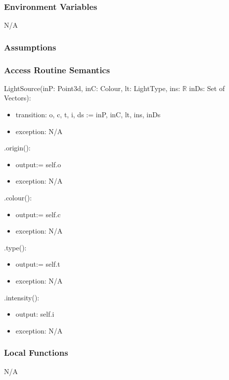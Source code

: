 \documentclass[12pt, titlepage]{article}
\begin{document}
\subsubsection{Environment Variables}
N/A

\subsubsection{Assumptions}

\subsubsection{Access Routine Semantics}

\noindent LightSource(inP: Point3d, inC: Colour, lt: LightType, ins: 
$\mathbb{R}$ inDs: Set of Vectors):
\begin{itemize}
	\item transition: o, c, t, i, ds := inP, inC, lt, ins, inDs
	\item exception: N/A
\end{itemize}

\noindent .origin():
\begin{itemize}
	\item output:= self.o
	\item exception: N/A
\end{itemize}

\noindent .colour():
\begin{itemize}
	\item output:= self.c
	\item exception: N/A
\end{itemize}

\noindent .type():
\begin{itemize}
	\item output:= self.t
	\item exception: N/A
\end{itemize}

\noindent .intensity():
\begin{itemize}
	\item output: self.i
	\item exception: N/A
\end{itemize}

\subsubsection{Local Functions}
N/A
\end{document}
